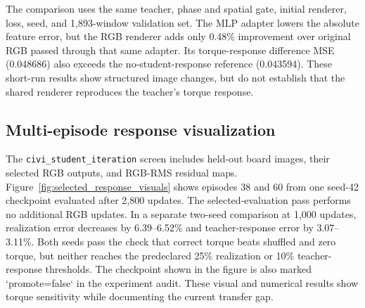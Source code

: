 \documentclass[10pt,twocolumn,letterpaper]{article}
\begin{document}
\begin{table}[t]
\centering
\caption{Short-run renderer architecture comparison at the common 1,000-update
checkpoint. The last column is the renderer's improvement over original RGB
using the same frozen adapter.}
\label{tab:short_renderer}
\setlength{\tabcolsep}{2.4pt}
\end{table}

The comparison uses the same teacher, phase and spatial gate, initial renderer,
loss, seed, and 1,893-window validation set. The MLP adapter lowers the
absolute feature error, but the RGB renderer adds only 0.48\% improvement over
original RGB passed through that same adapter. Its torque-response difference
MSE (0.048686) also exceeds the no-student-response reference (0.043594).
These short-run results show structured image changes, but do not establish
that the shared renderer reproduces the teacher's torque response.

\subsection{Multi-episode response visualization}
The \texttt{civi\_student\_iteration} screen includes held-out board images,
their selected RGB outputs, and RGB-RMS residual maps. Figure~\ref{fig:selected_response_visuals}
shows episodes 38 and 60 from one seed-42 checkpoint evaluated after 2,800
updates. The selected-evaluation pass performs no additional RGB updates. In a
separate two-seed comparison at 1,000 updates, realization error decreases by
6.39--6.52\% and teacher-response error by 3.07--3.11\%. Both seeds pass the
check that correct torque beats shuffled and zero torque, but neither reaches
the predeclared 25\% realization or 10\% teacher-response thresholds. The
checkpoint shown in the figure is also marked `promote=false` in the experiment
audit. These visual and numerical results show torque sensitivity while
documenting the current transfer gap.
\end{document}
